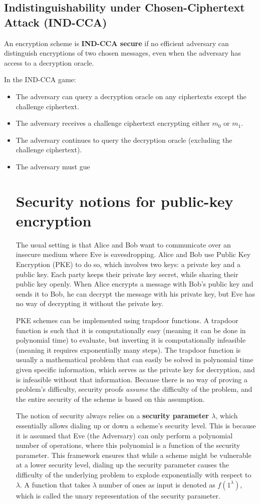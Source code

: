 \subsection{Indistinguishability under Chosen-Ciphertext Attack (IND-CCA)}

An encryption scheme is \textbf{IND-CCA secure} if no efficient adversary can distinguish encryptions of two chosen messages, even when the adversary has access to a decryption oracle.

In the IND-CCA game:
\begin{itemize}
    \item The adversary can query a decryption oracle on any ciphertexts except the challenge ciphertext.
    \item The adversary receives a challenge ciphertext encrypting either \(m_0\) or \(m_1\).
    \item The adversary continues to query the decryption oracle (excluding the challenge ciphertext).
    \item The adversary must gue\section{Security notions for public-key encryption}

The usual setting is that Alice and Bob want to communicate over an insecure medium where Eve is eavesdropping. Alice and Bob use Public Key Encryption (PKE) to do so, which involves two keys: a private key and a public key. Each party keeps their private key secret, while sharing their public key openly. When Alice encrypts a message with Bob's public key and sends it to Bob, he can decrypt the message with his private key, but Eve has no way of decrypting it without the private key.

PKE schemes can be implemented using trapdoor functions. A trapdoor function is such that it is computationally easy (meaning it can be done in polynomial time) to evaluate, but inverting it is computationally infeasible (meaning it requires exponentially many steps). The trapdoor function is usually a mathematical problem that can easily be solved in polynomial time given specific information, which serves as the private key for decryption, and is infeasible without that information. Because there is no way of proving a problem's difficulty, security proofs \textit{assume} the difficulty of the problem, and the entire security of the scheme is based on this assumption.

The notion of security always relies on a \textbf{security parameter $\lambda$}, which essentially allows dialing up or down a scheme's security level. This is because it is assumed that Eve (the Adversary) can only perform a polynomial number of operations, where this polynomial is a function of the security parameter. This framework ensures that while a scheme might be vulnerable at a lower security level, dialing up the security parameter causes the difficulty of the underlying problem to explode exponentially with respect to $\lambda$. A function that takes $\lambda$ number of ones as input is denoted as $f(1^\lambda)$, which is called the unary representation of the security parameter.


\end{itemize}
